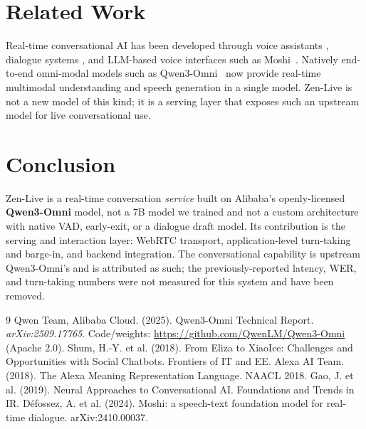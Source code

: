 \documentclass[11pt,a4paper]{article}
\begin{document}
\section{Related Work}

Real-time conversational AI has been developed through voice assistants
\cite{siri,alexa}, dialogue systems \cite{dialog}, and LLM-based voice interfaces such
as Moshi~\cite{voicellm}. Natively end-to-end omni-modal models such as
Qwen3-Omni~\cite{qwen3omni} now provide real-time multimodal understanding and speech
generation in a single model. Zen-Live is not a new model of this kind; it is a serving
layer that exposes such an upstream model for live conversational use.

\section{Conclusion}

Zen-Live is a real-time conversation \emph{service} built on Alibaba's openly-licensed
\textbf{Qwen3-Omni} model, not a 7B model we trained and not a custom architecture with
native VAD, early-exit, or a dialogue draft model. Its contribution is the serving and
interaction layer: WebRTC transport, application-level turn-taking and barge-in, and
backend integration. The conversational capability is upstream Qwen3-Omni's and is
attributed as such; the previously-reported latency, WER, and turn-taking numbers were
not measured for this system and have been removed.

\begin{thebibliography}{9}
 Qwen Team, Alibaba Cloud. (2025). Qwen3-Omni Technical Report. \textit{arXiv:2509.17765}. Code/weights: \url{https://github.com/QwenLM/Qwen3-Omni} (Apache 2.0).
 Shum, H.-Y. et al. (2018). From Eliza to XiaoIce: Challenges and Opportunities with Social Chatbots. Frontiers of IT and EE.
 Alexa AI Team. (2018). The Alexa Meaning Representation Language. NAACL 2018.
 Gao, J. et al. (2019). Neural Approaches to Conversational AI. Foundations and Trends in IR.
 Défossez, A. et al. (2024). Moshi: a speech-text foundation model for real-time dialogue. arXiv:2410.00037.
\end{thebibliography}
\end{document}
